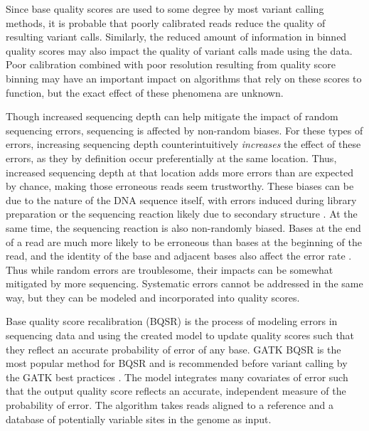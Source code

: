 Since base quality scores are used to some degree by most variant calling methods, it is probable that poorly calibrated reads reduce the quality of resulting variant calls.
Similarly, the reduced amount of information in binned quality scores may also impact the quality of variant calls made using the data.
Poor calibration combined with poor resolution resulting from quality score binning may have an important impact on algorithms that rely on these scores to function, but the exact effect of these phenomena are unknown.

Though increased sequencing depth can help mitigate the impact of random sequencing errors, sequencing is affected by non-random biases.
For these types of errors, increasing sequencing depth counterintuitively \textit{increases} the effect of these errors, as they by definition occur preferentially at the same location. Thus, increased sequencing depth at that location adds more errors than are expected by chance, making those erroneous reads seem trustworthy. 
These biases can be due to the nature of the DNA sequence itself, with errors induced during library preparation or the sequencing reaction likely due to secondary structure \parencite{meacham_identification_2011, nakamura_sequence-specific_2011, schirmer_insight_2015, ma_analysis_2019}.
At the same time, the sequencing reaction is also non-randomly biased. Bases at the end of a read are much more likely to be erroneous than bases at the beginning of the read, and the identity of the base and adjacent bases also affect the error rate \parencite{fox_accuracy_2014, schirmer_illumina_2016}. 
Thus while random errors are troublesome, their impacts can be somewhat mitigated by more sequencing. Systematic errors cannot be addressed in the same way, but they can be modeled and incorporated into quality scores.

Base quality score recalibration (BQSR) is the process of modeling errors in sequencing data and using the created model to update quality scores such that they reflect an accurate probability of error of any base.
GATK BQSR  is the most popular method for BQSR and is recommended before variant calling by the GATK best practices \parencite{auwera_fastq_2013}.
The model integrates many covariates of error such that the output quality score reflects an accurate, independent measure of the probability of error.
The algorithm takes reads aligned to a reference and a database of potentially variable sites in the genome as input.

